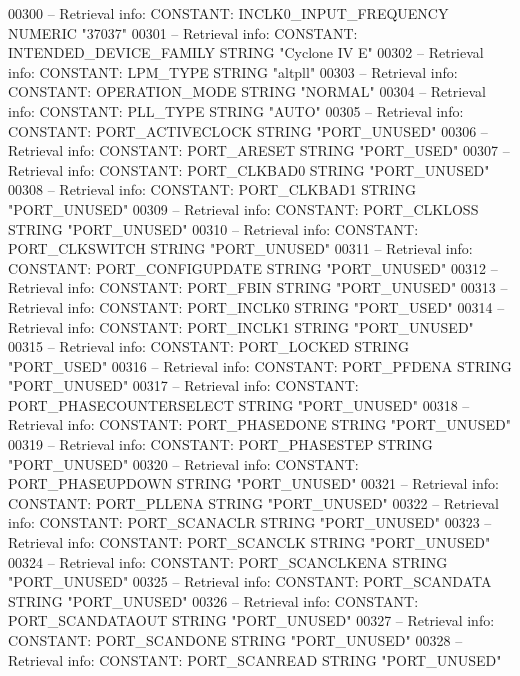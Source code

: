\begin{DoxyCode}
{00300 \textcolor{keyword}{-- Retrieval info: CONSTANT: INCLK0\_INPUT\_FREQUENCY NUMERIC "37037"}
00301 \textcolor{keyword}{-- Retrieval info: CONSTANT: INTENDED\_DEVICE\_FAMILY STRING "Cyclone IV E"}
00302 \textcolor{keyword}{-- Retrieval info: CONSTANT: LPM\_TYPE STRING "altpll"}
00303 \textcolor{keyword}{-- Retrieval info: CONSTANT: OPERATION\_MODE STRING "NORMAL"}
00304 \textcolor{keyword}{-- Retrieval info: CONSTANT: PLL\_TYPE STRING "AUTO"}
00305 \textcolor{keyword}{-- Retrieval info: CONSTANT: PORT\_ACTIVECLOCK STRING "PORT\_UNUSED"}
00306 \textcolor{keyword}{-- Retrieval info: CONSTANT: PORT\_ARESET STRING "PORT\_USED"}
00307 \textcolor{keyword}{-- Retrieval info: CONSTANT: PORT\_CLKBAD0 STRING "PORT\_UNUSED"}
00308 \textcolor{keyword}{-- Retrieval info: CONSTANT: PORT\_CLKBAD1 STRING "PORT\_UNUSED"}
00309 \textcolor{keyword}{-- Retrieval info: CONSTANT: PORT\_CLKLOSS STRING "PORT\_UNUSED"}
00310 \textcolor{keyword}{-- Retrieval info: CONSTANT: PORT\_CLKSWITCH STRING "PORT\_UNUSED"}
00311 \textcolor{keyword}{-- Retrieval info: CONSTANT: PORT\_CONFIGUPDATE STRING "PORT\_UNUSED"}
00312 \textcolor{keyword}{-- Retrieval info: CONSTANT: PORT\_FBIN STRING "PORT\_UNUSED"}
00313 \textcolor{keyword}{-- Retrieval info: CONSTANT: PORT\_INCLK0 STRING "PORT\_USED"}
00314 \textcolor{keyword}{-- Retrieval info: CONSTANT: PORT\_INCLK1 STRING "PORT\_UNUSED"}
00315 \textcolor{keyword}{-- Retrieval info: CONSTANT: PORT\_LOCKED STRING "PORT\_USED"}
00316 \textcolor{keyword}{-- Retrieval info: CONSTANT: PORT\_PFDENA STRING "PORT\_UNUSED"}
00317 \textcolor{keyword}{-- Retrieval info: CONSTANT: PORT\_PHASECOUNTERSELECT STRING "PORT\_UNUSED"}
00318 \textcolor{keyword}{-- Retrieval info: CONSTANT: PORT\_PHASEDONE STRING "PORT\_UNUSED"}
00319 \textcolor{keyword}{-- Retrieval info: CONSTANT: PORT\_PHASESTEP STRING "PORT\_UNUSED"}
00320 \textcolor{keyword}{-- Retrieval info: CONSTANT: PORT\_PHASEUPDOWN STRING "PORT\_UNUSED"}
00321 \textcolor{keyword}{-- Retrieval info: CONSTANT: PORT\_PLLENA STRING "PORT\_UNUSED"}
00322 \textcolor{keyword}{-- Retrieval info: CONSTANT: PORT\_SCANACLR STRING "PORT\_UNUSED"}
00323 \textcolor{keyword}{-- Retrieval info: CONSTANT: PORT\_SCANCLK STRING "PORT\_UNUSED"}
00324 \textcolor{keyword}{-- Retrieval info: CONSTANT: PORT\_SCANCLKENA STRING "PORT\_UNUSED"}
00325 \textcolor{keyword}{-- Retrieval info: CONSTANT: PORT\_SCANDATA STRING "PORT\_UNUSED"}
00326 \textcolor{keyword}{-- Retrieval info: CONSTANT: PORT\_SCANDATAOUT STRING "PORT\_UNUSED"}
00327 \textcolor{keyword}{-- Retrieval info: CONSTANT: PORT\_SCANDONE STRING "PORT\_UNUSED"}
00328 \textcolor{keyword}{-- Retrieval info: CONSTANT: PORT\_SCANREAD STRING "PORT\_UNUSED"}
}
\end{DoxyCode}
